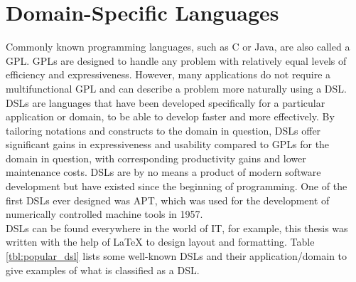 \section{Domain-Specific Languages}
Commonly known programming languages, such as C or Java, are also called a \ac{GPL}. \ac{GPL}s are designed to handle any problem with relatively equal levels of efficiency and expressiveness. However, many applications do not require a multifunctional \ac{GPL} and can describe a problem more naturally using a \ac{DSL}. \ac{DSL}s are languages that have been developed specifically for a particular application or domain, to be able to develop faster and more effectively. \parencite[cf.][p. 1]{hudak_domain-specific_1997}
By tailoring notations and constructs to the domain in question, \ac{DSL}s offer significant gains in expressiveness and usability compared to \ac{GPL}s for the domain in question, with corresponding productivity gains and lower maintenance costs. \parencite[cf.][p. 317]{mernik_when_2005}
\ac{DSL}s are by no means a product of modern software development but have existed since the beginning of programming. One of the first \ac{DSL}s ever designed was \ac{APT}, which was used for the development of numerically controlled machine tools in 1957. \parencite[cf.][pp. 283-284]{wexelblat_origins_1978}\\
\ac{DSL}s can be found everywhere in the world of IT, for example, this thesis was written with the help of \LaTeX{} to design layout and formatting. Table \ref{tbl:popular_dsl} lists some well-known \ac{DSL}s and their application/domain to give examples of what is classified as a \ac{DSL}.
